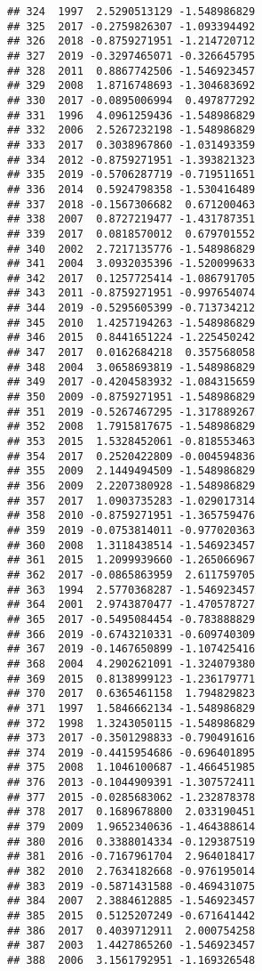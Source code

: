 \documentclass[
]{article}
\begin{document}
\begin{verbatim}
## 324  1997  2.5290513129 -1.548986829
## 325  2017 -0.2759826307 -1.093394492
## 326  2018 -0.8759271951 -1.214720712
## 327  2019 -0.3297465071 -0.326645795
## 328  2011  0.8867742506 -1.546923457
## 329  2008  1.8716748693 -1.304683692
## 330  2017 -0.0895006994  0.497877292
## 331  1996  4.0961259436 -1.548986829
## 332  2006  2.5267232198 -1.548986829
## 333  2017  0.3038967860 -1.031493359
## 334  2012 -0.8759271951 -1.393821323
## 335  2019 -0.5706287719 -0.719511651
## 336  2014  0.5924798358 -1.530416489
## 337  2018 -0.1567306682  0.671200463
## 338  2007  0.8727219477 -1.431787351
## 339  2017  0.0818570012  0.679701552
## 340  2002  2.7217135776 -1.548986829
## 341  2004  3.0932035396 -1.520099633
## 342  2017  0.1257725414 -1.086791705
## 343  2011 -0.8759271951 -0.997654074
## 344  2019 -0.5295605399 -0.713734212
## 345  2010  1.4257194263 -1.548986829
## 346  2015  0.8441651224 -1.225450242
## 347  2017  0.0162684218  0.357568058
## 348  2004  3.0658693819 -1.548986829
## 349  2017 -0.4204583932 -1.084315659
## 350  2009 -0.8759271951 -1.548986829
## 351  2019 -0.5267467295 -1.317889267
## 352  2008  1.7915817675 -1.548986829
## 353  2015  1.5328452061 -0.818553463
## 354  2017  0.2520422809 -0.004594836
## 355  2009  2.1449494509 -1.548986829
## 356  2009  2.2207380928 -1.548986829
## 357  2017  1.0903735283 -1.029017314
## 358  2010 -0.8759271951 -1.365759476
## 359  2019 -0.0753814011 -0.977020363
## 360  2008  1.3118438514 -1.546923457
## 361  2015  1.2099939660 -1.265066967
## 362  2017 -0.0865863959  2.611759705
## 363  1994  2.5770368287 -1.546923457
## 364  2001  2.9743870477 -1.470578727
## 365  2017 -0.5495084454 -0.783888829
## 366  2019 -0.6743210331 -0.609740309
## 367  2019 -0.1467650899 -1.107425416
## 368  2004  4.2902621091 -1.324079380
## 369  2015  0.8138999123 -1.236179771
## 370  2017  0.6365461158  1.794829823
## 371  1997  1.5846662134 -1.548986829
## 372  1998  1.3243050115 -1.548986829
## 373  2017 -0.3501298833 -0.790491616
## 374  2019 -0.4415954686 -0.696401895
## 375  2008  1.1046100687 -1.466451985
## 376  2013 -0.1044909391 -1.307572411
## 377  2015 -0.0285683062 -1.232878378
## 378  2017  0.1689678800  2.033190451
## 379  2009  1.9652340636 -1.464388614
## 380  2016  0.3388014334 -0.129387519
## 381  2016 -0.7167961704  2.964018417
## 382  2010  2.7634182668 -0.976195014
## 383  2019 -0.5871431588 -0.469431075
## 384  2007  2.3884612885 -1.546923457
## 385  2015  0.5125207249 -0.671641442
## 386  2017  0.4039712911  2.000754258
## 387  2003  1.4427865260 -1.546923457
## 388  2006  3.1561792951 -1.169326548

\end{verbatim}
\end{document}
